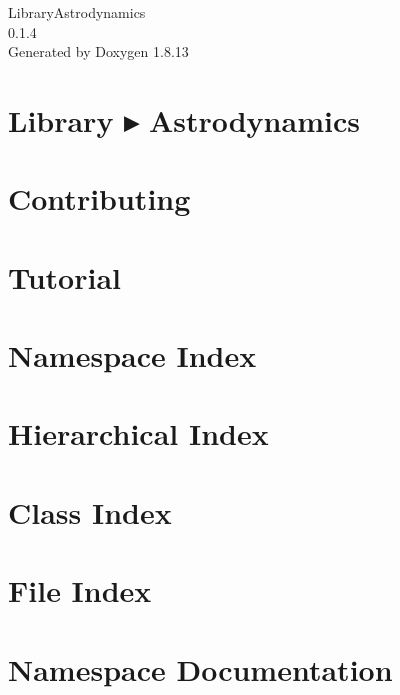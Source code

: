 \documentclass[twoside]{book}
\newcommand{\+}{\discretionary{\mbox{\scriptsize$\hookleftarrow$}}{}{}}
\newcommand{\clearemptydoublepage}{%
  \newpage{\pagestyle{empty}\cleardoublepage}%
}
\begin{document}
\hypersetup{pageanchor=false,
             bookmarksnumbered=true,
             pdfencoding=unicode
            }
\begin{titlepage}
\vspace*{7cm}
\begin{center}%
{\Large Library\+Astrodynamics \\[1ex]\large 0.\+1.\+4 }\\
\vspace*{1cm}
{\large Generated by Doxygen 1.8.13}\\
\end{center}
\end{titlepage}
\clearemptydoublepage
{}
\tableofcontents
\clearemptydoublepage
{}
\hypersetup{pageanchor=true}

\chapter{Library ▸ Astrodynamics}
\label{index}\hypertarget{index}{}
\chapter{Contributing}
\label{md__c_o_n_t_r_i_b_u_t_i_n_g}

\chapter{Tutorial}
\label{md_docs__tutorial}

\chapter{Namespace Index}

\chapter{Hierarchical Index}

\chapter{Class Index}

\chapter{File Index}

\chapter{Namespace Documentation}











\end{document}
